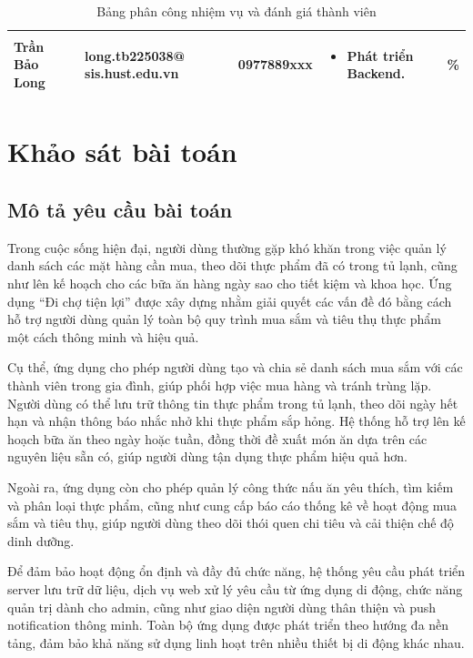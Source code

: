 \documentclass[a4paper,12pt]{article}
\begin{document}
\begin{table}[H]
\begin{tabularx}{\textwidth}{|>{\RaggedRight\arraybackslash}p{2.8cm}|>{\RaggedRight\arraybackslash}p{4.2cm}|>{\centering\arraybackslash}p{2.2cm}|X|>{\centering\arraybackslash}p{1.5cm}|}
        Trần Bảo Long & long.tb225038@ \newline sis.hust.edu.vn & 0977889xxx & 
        \begin{itemize}[leftmargin=*, nosep]
            \item Phát triển Backend.
        \end{itemize} & 100\% \\ \hline
    \end{tabularx}
    \caption{Bảng phân công nhiệm vụ và đánh giá thành viên}
    \label{tab:phan-cong}
\end{table}


\newpage
\section{Khảo sát bài toán}
\subsection{Mô tả yêu cầu bài toán}
Trong cuộc sống hiện đại, người dùng thường gặp khó khăn trong việc quản lý danh sách các mặt hàng cần mua, theo dõi thực phẩm đã có trong tủ lạnh, cũng như lên kế hoạch cho các bữa ăn hàng ngày sao cho tiết kiệm và khoa học. Ứng dụng “Đi chợ tiện lợi” được xây dựng nhằm giải quyết các vấn đề đó bằng cách hỗ trợ người dùng quản lý toàn bộ quy trình mua sắm và tiêu thụ thực phẩm một cách thông minh và hiệu quả. 

Cụ thể, ứng dụng cho phép người dùng tạo và chia sẻ danh sách mua sắm với các thành viên trong gia đình, giúp phối hợp việc mua hàng và tránh trùng lặp. Người dùng có thể lưu trữ thông tin thực phẩm trong tủ lạnh, theo dõi ngày hết hạn và nhận thông báo nhắc nhở khi thực phẩm sắp hỏng. Hệ thống hỗ trợ lên kế hoạch bữa ăn theo ngày hoặc tuần, đồng thời đề xuất món ăn dựa trên các nguyên liệu sẵn có, giúp người dùng tận dụng thực phẩm hiệu quả hơn. 

Ngoài ra, ứng dụng còn cho phép quản lý công thức nấu ăn yêu thích, tìm kiếm và phân loại thực phẩm, cũng như cung cấp báo cáo thống kê về hoạt động mua sắm và tiêu thụ, giúp người dùng theo dõi thói quen chi tiêu và cải thiện chế độ dinh dưỡng. 

Để đảm bảo hoạt động ổn định và đầy đủ chức năng, hệ thống yêu cầu phát triển server lưu trữ dữ liệu, dịch vụ web xử lý yêu cầu từ ứng dụng di động, chức năng quản trị dành cho admin, cũng như giao diện người dùng thân thiện và push notification thông minh. Toàn bộ ứng dụng được phát triển theo hướng đa nền tảng, đảm bảo khả năng sử dụng linh hoạt trên nhiều thiết bị di động khác nhau. 
\end{document}
